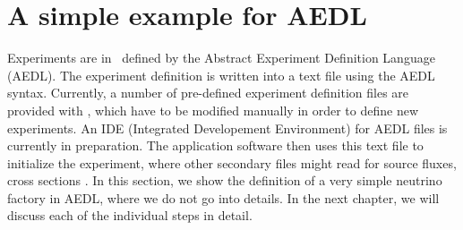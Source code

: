 \section{A simple example for AEDL}

Experiments are in \GLOBES\ defined by the Abstract Experiment Definition Language (AEDL). The experiment definition is written into a text file using the AEDL syntax. Currently, a number of pre-defined experiment definition files are provided with \GLOBES , which have to be modified manually in order to define new experiments. An IDE (Integrated Developement Environment) for AEDL files is currently in preparation. The application software then uses this text file to initialize the experiment, where other secondary files might read for source fluxes, cross sections \etc . In this section, we show the definition of a very simple neutrino factory in AEDL, where we do not go into details. In the next chapter, we will discuss each of the individual steps in detail.

